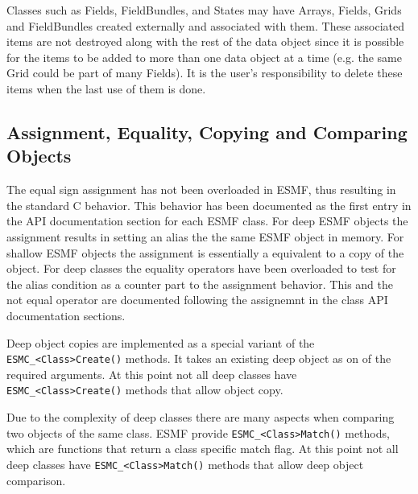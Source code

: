 Classes such as Fields, FieldBundles, and States may have Arrays, 
Fields, Grids and FieldBundles created externally and associated with
them.  These associated items are not destroyed along with the rest  
of the data object since it is possible for the items to be added 
to more than one data object at a time (e.g. the same Grid could 
be part of many Fields).  It is the user's responsibility to delete 
these items when the last use of them is done.

\subsection{Assignment, Equality, Copying and Comparing Objects}

The equal sign assignment has not been overloaded in ESMF, thus resulting in
the standard C behavior. This behavior has been documented as the first
entry in the API documentation section for each ESMF class. For deep ESMF
objects the assignment results in setting an alias the the same ESMF object
in memory. For shallow ESMF objects the assignment is essentially a equivalent
to a copy of the object. For deep classes the equality operators have been
overloaded to test for the alias condition as a counter part to the assignment
behavior. This and the not equal operator are documented following the
assignemnt in the class API documentation sections. 

Deep object copies are implemented as a special variant of the
{\tt ESMC\_<Class>Create()} methods. It takes an existing deep object as
on of the required arguments. At this point not all deep classes have
{\tt ESMC\_<Class>Create()} methods that allow object copy.

Due to the complexity of deep classes there are many aspects when comparing two
objects of the same class. ESMF provide {\tt ESMC\_<Class>Match()} methods,
which are functions that return a class specific match flag. At this point not
all deep classes have {\tt ESMC\_<Class>Match()} methods that allow deep object
comparison.

%

